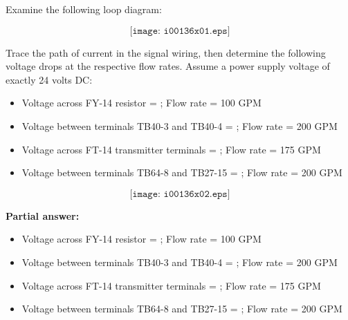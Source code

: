 

Examine the following loop diagram:

$$\texttt{[image: i00136x01.eps]}$$

Trace the path of current in the signal wiring, then determine the following voltage drops at the respective flow rates.  Assume a power supply voltage of exactly 24 volts DC:

\begin{itemize}
\item{} Voltage across FY-14 resistor = \underbar{\hskip 50pt} ; Flow rate = 100 GPM
\item{} Voltage between terminals TB40-3 and TB40-4 = \underbar{\hskip 50pt} ; Flow rate = 200 GPM
\item{} Voltage across FT-14 transmitter terminals = \underbar{\hskip 50pt} ; Flow rate = 175 GPM
\item{} Voltage between terminals TB64-8 and TB27-15 = \underbar{\hskip 50pt} ; Flow rate = 200 GPM
\end{itemize}







$$\texttt{[image: i00136x02.eps]}$$

\noindent
{\bf Partial answer:}

\begin{itemize}
\item{} Voltage across FY-14 resistor =  ; Flow rate = 100 GPM
\item{} Voltage between terminals TB40-3 and TB40-4 =  ; Flow rate = 200 GPM
\item{} Voltage across FT-14 transmitter terminals = \underbar{\hskip 50pt} ; Flow rate = 175 GPM
\item{} Voltage between terminals TB64-8 and TB27-15 = \underbar{\hskip 50pt} ; Flow rate = 200 GPM
\end{itemize}








